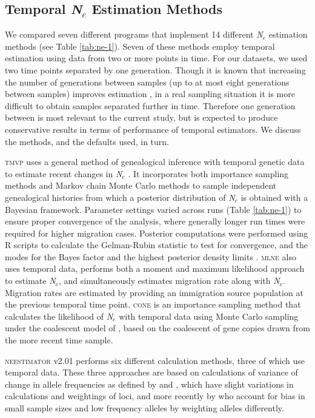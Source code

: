 \subsection{Temporal \emph{N}$_e$ Estimation Methods}
We compared seven different programs that implement 14 different \emph{N}$_e$ estimation 
methods (see Table \ref{tab:ne-1}). Seven of these methods employ temporal estimation using data from two 
or more points in time. For our datasets, we used two time points separated by one generation. 
Though it is known that increasing the number of generations between samples (up to at most eight 
generations between samples) improves estimation \citep{Wang:2003}, in a real sampling 
situation it is more difficult to obtain samples separated further in time. Therefore one generation 
between is most relevant to the current study, but is expected to produce conservative results 
in terms of performance of temporal estimators. We discuss the methods, and the defaults used, in turn.

\textsc{tmvp} uses a general method of genealogical inference with temporal genetic data to 
estimate recent changes in \emph{N}$_e$ \citep{Beaumont:2003}. It incorporates both importance 
sampling methods and Markov chain Monte Carlo methods to sample independent genealogical 
histories from which a posterior distribution of \emph{N}$_e$ is obtained with a Bayesian 
framework. Parameter settings varied across runs (Table \ref{tab:ne-1}) to ensure proper convergence of 
the analysis, where generally longer run times were required for higher migration cases. 
Posterior computations were performed using R scripts to calculate the Gelman-Rubin statistic 
to test for convergence, and the modes for the Bayes factor and the highest posterior density 
limits \citep{Barker:2011}. \textsc{mlne} \citep{Wang:2003} also uses temporal data, performs 
both a moment and maximum likelihood approach to estimate \emph{N}$_e$, and simultaneously 
estimates migration rate along with \emph{N}$_e$. Migration rates are estimated by providing 
an immigration source population at the previous temporal time point. \textsc{cone} \citep{Anderson:2005} 
is an importance sampling method that calculates the likelihood of \emph{N}$_e$ with temporal 
data using Monte Carlo sampling under the coalescent model of \citet{Berthier:2002}, based on 
the coalescent of gene copies drawn from the more recent time sample.

\textsc{neestimator} v2.01 \citep{Do:2014} performs six different calculation methods, three 
of which use temporal data. These three approaches are based on calculations of variance of 
change in allele frequencies as defined by \citet{Nei:1981} and \citet{Pollak:1983}, which 
have slight variations in calculations and weightings of loci, and more recently by \citet{Jorde:2007} 
who account for bias in small sample sizes and low frequency alleles by 
weighting alleles differently.

